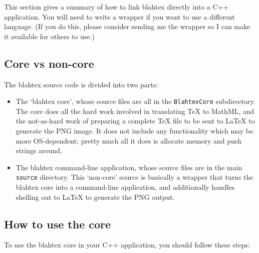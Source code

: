 \documentclass{article}
\begin{document}
This section gives a summary of how to link blahtex directly into a C++ application. You will need to write a wrapper if you want to use a different language. (If you do this, please consider sending me the wrapper so I can make it available for others to use.)

\subsection{Core vs non-core}

The blahtex source code is divided into two parts:
\begin{itemize}
\item The `blahtex core', whose source files are all in the \texttt{BlahtexCore} subdirectory. The core does all the hard work involved in translating \TeX{} to MathML, and the not-as-hard work of preparing a complete \TeX{} file to be sent to \LaTeX{} to generate the PNG image. It does not include any functionality which may be more OS-dependent; pretty much all it does is allocate memory and push strings around. 
\item The blahtex command-line application, whose source files are in the main \texttt{source} directory. This `non-core' source is basically a wrapper that turns the blahtex core into a command-line application, and additionally handles shelling out to \LaTeX{} to generate the PNG output.
\end{itemize}


\subsection{How to use the core}

To use the blahtex core in your C++ application, you should follow these steps:
\end{document}
